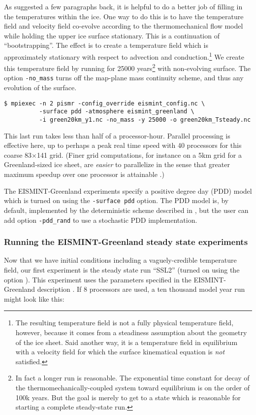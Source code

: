 As suggested a few paragraphs back, it is helpful to do a better job of filling in the temperatures within the ice.  One way to do this is to have the temperature field and velocity field co-evolve according to the thermomechanical flow model while holding the upper ice surface stationary.  This is a continuation of ``bootstrapping''.  The effect is to create a temperature field which is approximately stationary with respect to advection and conduction.\footnote{The resulting temperature field is not a fully physical temperature field, however, because it comes from a steadiness assumption about the geometry of the ice sheet.  Said another way, it is a temperature field in equilibrium with a velocity field for which the surface kinematical equation \cite{Fowler} is \emph{not} satisfied.}  We create this temperature field by running for 25000 years\footnote{In fact a longer run is reasonable.  The exponential time constant for decay of the thermomechanically-coupled system toward equilibrium is on the order of 100k years.  But the goal is merely to get to a state which is reasonable for starting a complete steady-state run.} with non-evolving surface.  The option \texttt{-no_mass} turns off the map-plane mass continuity scheme, and thus any evolution of the surface.

\begin{verbatim}
$ mpiexec -n 2 pismr -config_override eismint_config.nc \
          -surface pdd -atmosphere eismint_greenland \
          -i green20km_y1.nc -no_mass -y 25000 -o green20km_Tsteady.nc
\end{verbatim}%
\noindent This last run takes less than half of a processor-hour.  Parallel processing is effective here, up to perhaps a peak real time speed with 40 processors for this coarse 83$\times$141 grid.  (Finer grid computations, for instance on a 5km grid for a Greenland-sized ice sheet, are \emph{easier} to parallelize in the sense that greater maximum speedup over one processor is attainable \cite{BBssasliding}.)

The EISMINT-Greenland experiments \cite{RitzEISMINT} specify a positive degree day (PDD) model which is turned on using the \texttt{-surface pdd} option.  The PDD model is, by default, implemented by the deterministic scheme described in \cite{CalovGreve05}, but the user can add option \texttt{-pdd_rand} to use a stochastic PDD implementation.

\subsubsection*{Running the EISMINT-Greenland steady state experiments}  Now that we have initial conditions including a vaguely-credible temperature field, our first experiment is the steady state run ``SSL2'' (turned on using the option \intextoption{ssl2}).  This experiment uses the parameters specified in the EISMINT-Greenland description \cite{RitzEISMINT}.  If 8 processors are used, a ten thousand model year run might look like this:


